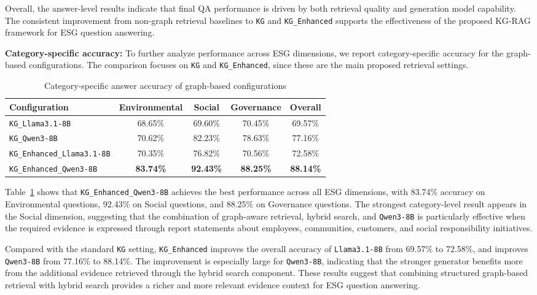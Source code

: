\documentclass[sn-mathphys, oneside]{sn-jnl}
\begin{document}
Overall, the answer-level results indicate that final QA performance is driven by
both retrieval quality and generation model capability. The consistent improvement
from non-graph retrieval baselines to \texttt{KG} and \texttt{KG\_Enhanced} supports
the effectiveness of the proposed KG-RAG framework for ESG question answering.


\textbf{Category-specific accuracy: }To further analyze performance across ESG dimensions, we report category-specific
accuracy for the graph-based configurations. The comparison focuses on
\texttt{KG} and \texttt{KG\_Enhanced}, since these are the main proposed retrieval
settings.

\begin{table}[htbp]
    \centering
    \caption{Category-specific answer accuracy of graph-based configurations}
    \label{tab:category_accuracy}
    \begin{tabular}{lcccc}
    \toprule
    Configuration & Environmental & Social & Governance & Overall \\
    \midrule
    \texttt{KG\_Llama3.1-8B} & 68.65\% & 69.60\% & 70.45\% & 69.57\% \\
    \texttt{KG\_Qwen3-8B} & 70.62\% & 82.23\% & 78.63\% & 77.16\% \\
    \texttt{KG\_Enhanced\_Llama3.1-8B} & 70.35\% & 76.82\% & 70.56\% & 72.58\% \\
    \texttt{KG\_Enhanced\_Qwen3-8B} & \textbf{83.74\%} & \textbf{92.43\%} & \textbf{88.25\%} & \textbf{88.14\%} \\
    \bottomrule
    \end{tabular}
\end{table}

Table~\ref{tab:category_accuracy} shows that \texttt{KG\_Enhanced\_Qwen3-8B}
achieves the best performance across all ESG dimensions, with 83.74\% accuracy on
Environmental questions, 92.43\% on Social questions, and 88.25\% on Governance
questions. The strongest category-level result appears in the Social dimension,
suggesting that the combination of graph-aware retrieval, hybrid search, and
\texttt{Qwen3-8B} is particularly effective when the required evidence is expressed
through report statements about employees, communities, customers, and social
responsibility initiatives.

Compared with the standard \texttt{KG} setting, \texttt{KG\_Enhanced} improves the
overall accuracy of \texttt{Llama3.1-8B} from 69.57\% to 72.58\%, and improves
\texttt{Qwen3-8B} from 77.16\% to 88.14\%. The improvement is especially large for
\texttt{Qwen3-8B}, indicating that the stronger generator benefits more from the
additional evidence retrieved through the hybrid search component. These results
suggest that combining structured graph-based retrieval with hybrid search provides
a richer and more relevant evidence context for ESG question answering.
\end{document}
